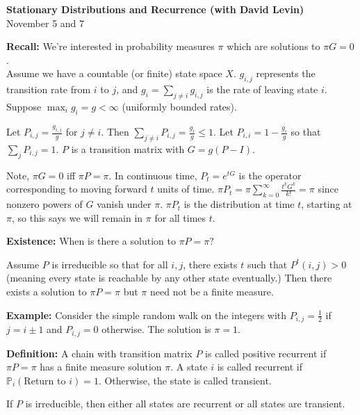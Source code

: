 \documentclass{article}
\newcommand{\I}{\infty}
\newcommand{\PP}{{\mathbb{P}}}
\begin{document}
\center \textbf{Stationary Distributions and Recurrence (with David Levin)} \\
November 5 and 7
\vspace{5mm}
\flushleft

\textbf{Recall:} We're interested in probability measures $\pi$ which are solutions to $\pi G=0$. \\


\vspace{5mm}
Assume we have a countable (or finite) state space $X$. $g_{i,j}$ represents the transition rate from $i$ to $j$, and $g_i=\sum_{j\neq i}g_{i,j}$ is the rate of leaving state $i$. Suppose $\max_ig_i=g<\I$ (uniformly bounded rates).  

\vspace{5mm}
Let $P_{i,j}=\frac{g_{i,j}}{g}$ for $j\neq i$. Then $\sum_{j\neq i}P_{i,j}=\frac{g_i}{g}\leq 1$. Let $P_{i,i}=1-\frac{g_i}{g}$ so that $\sum_j P_{i,j}=1$. $P$ is a transition matrix with $G=g(P-I)$.

\vspace{5mm}
Note, $\pi G=0$ iff $\pi P=\pi$. In continuous time, $P_t=e^{tG}$ is the operator corresponding to moving forward $t$ units of time. $\pi P_t=\pi\sum_{k=0}^\I\frac{t^kG^k}{k!}=\pi$ since nonzero powers of $G$ vanish under $\pi$. $\pi P_t$ is the distribution at time $t$, starting at $\pi$, so this says we will remain in $\pi$ for all times $t$.

\vspace{10mm}
\textbf{Existence:} When is there a solution to $\pi P=\pi?$

\vspace{5mm}
Assume $P$ is irreducible so that for all $i,j$, there exists $t$ such that $P^t(i,j)>0$ (meaning every state is reachable by any other state eventually.) Then there exists a solution to $\pi P=\pi$ but $\pi$ need not be a finite measure.

\vspace{5mm}
\textbf{Example:} Consider the simple random walk on the integers with $P_{i,j}=\frac{1}{2}$ if $j=i\pm 1$ and $P_{i,j}=0$ otherwise. The solution is $\pi=1$.

\vspace{5mm}
\textbf{Definition:} A chain with transition matrix $P$ is called positive recurrent if $\pi P=\pi$ has a finite measure solution $\pi$. A state $i$ is called recurrent if $\PP_i(\text{Return to }i)=1$. Otherwise, the state is called transient. 

\vspace{5mm}
If $P$ is irreducible, then either all states are recurrent or all states are transient.
\end{document}
